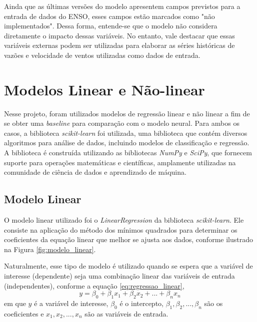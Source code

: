 Ainda que as últimas versões do modelo apresentem campos previstos para a entrada de dados do ENSO, esses campos
estão marcados como "não implementados". Dessa forma, entende-se que o modelo não considera diretamente o impacto 
dessas variáveis. No entanto, vale destacar que essas variáveis externas podem ser utilizadas para elaborar as séries históricas de 
vazões e velocidade de ventos utilizadas como dados de entrada. 


\newpage
\section{Modelos Linear e Não-linear}
Nesse projeto, foram utilizados modelos de regressão linear e não linear a fim de se obter uma \textit{baseline} para
comparação com o modelo neural. Para ambos os casos, a biblioteca \textit{scikit-learn} foi utilizada, uma biblioteca
que contém diversos algoritmos para análise de dados, incluindo modelos de classificação e regressão. A biblioteca
é construída utilizando as bibliotecas \textit{NumPy} e \textit{SciPy}, que fornecem suporte para operações
matemáticas e científicas, amplamente utilizadas na comunidade de ciência de dados e aprendizado de máquina.

\subsection{Modelo Linear}
O modelo linear utilizado foi o \textit{LinearRegression} da biblioteca \textit{scikit-learn}. Ele consiste na
aplicação do método dos mínimos quadrados para determinar os coeficientes da equação linear que melhor se ajusta aos dados,
conforme ilustrado na Figura \ref{fig:modelo_linear}.
\begin{figure}[!ht]
	{}
	{}
\end{figure}

Naturalmente, esse tipo de modelo é utilizado quando se espera que a variável de interesse (dependente) seja uma combinação linear
das variáveis de entrada (independentes), conforme a equação \ref{eq:regressao_linear},
\begin{equation}
\label{eq:regressao_linear}
y = \beta_0 + \beta_1 x_1 + \beta_2 x_2 + ... + \beta_n x_n
\end{equation}
em que $y$ é a variável de interesse, 
$\beta_0$ é o intercepto, $\beta_1, \beta_2, ..., \beta_n$ são os coeficientes e $x_1, x_2, ..., x_n$ são as variáveis de entrada.

